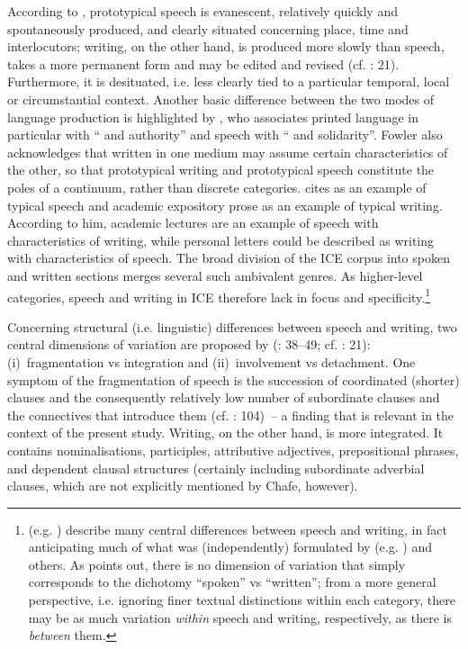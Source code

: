 According to \citet[42–45]{Chafe1994}, prototypical speech is evanescent, relatively quickly and spontaneously produced, and clearly situated concerning place, time and interlocutors; writing, on the other hand, is produced more slow\-ly than speech, takes a more permanent form and may be edited and revised (cf. \citealt{Linell2005}: 21). Furthermore, it is desituated, i.e. less clearly tied to a particular temporal, local or circumstantial context. Another basic difference between the two modes of language production is highlighted by \citet[59]{Fowler1991}, who associates printed language in particular with “ and authority” and speech with “ and solidarity”. Fowler also acknowledges that  written in one medium may assume certain characteristics of the other, so that prototypical writing and prototypical speech constitute the poles of a continuum, rather than discrete categories. \citet[45–46]{Biber1988} cites  as an example of typical speech and academic expository prose as an example of typical writing. According to him, academic lectures are an example of speech with characteristics of writing, while personal letters could be described as writing with characteristics of speech. The broad division of the ICE corpus into spoken and written sections merges several such ambivalent genres. As higher-level categories, speech and writing in ICE therefore lack in focus and specificity.\footnote{\citeauthor{KochOesterreicher1985} (e.g. \citeyear{KochOesterreicher1985}) describe many central differences between speech and writing, in fact anticipating much of what was (independently) formulated by \citeauthor{Biber1988} (e.g. \citeyear{Biber1988}) and others. As \citet[24, 36–37]{Biber1988} points out, there is no dimension of variation that simply corresponds to the dichotomy “spoken” vs “written”; from a more general perspective, i.e. ignoring finer textual distinctions within each category, there may be as much variation \textit{within} speech and writing, respectively, as there is \textit{between} them.}

  Concerning structural (i.e. linguistic) differences between speech and writing, two central dimensions of variation are proposed by \citeauthor{Chafe1982} (\citeyear{Chafe1982}: 38–49; cf. \citealt{Chafe1985,ChafeDanielewicz1987,Biber1988}: 21):
(i)~fragmentation vs integration and
(ii)~involvement vs detachment. One symptom of the fragmentation of speech is the succession of coordinated (shorter) clauses and the consequently relatively low number of subordinate clauses and the connectives that introduce them (cf. \citealt{Akinnaso1982}: 104)~– a finding that is relevant in the context of the present study. Writing, on the other hand, is more integrated. It contains nominalisations, participles, attributive adjectives, prepositional phrases, and dependent clausal structures (certainly including subordinate adverbial clauses, which are not explicitly mentioned by Chafe, however).

